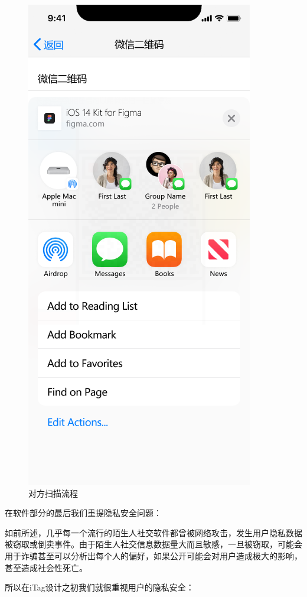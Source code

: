 \documentclass[UTF8]{ctexart}
\begin{document}
\begin{figure}[htbp]
{\begin{minipage}[b]{.3\linewidth}
            \includegraphics[scale=0.3]{ShareWechat.png}
        \end{minipage}
    }
    \caption{对方扫描流程}
    \label{ScanProcedure}
\end{figure}

在软件部分的最后我们重提隐私安全问题：

如前所述，几乎每一个流行的陌生人社交软件都曾被网络攻击，发生用户隐私数据被窃取或倒卖事件。由于陌生人社交信息数据量大而且敏感，一旦被窃取，可能会用于诈骗甚至可以分析出每个人的偏好，如果公开可能会对用户造成极大的影响，甚至造成社会性死亡。

所以在iTag设计之初我们就很重视用户的隐私安全：
\end{document}
